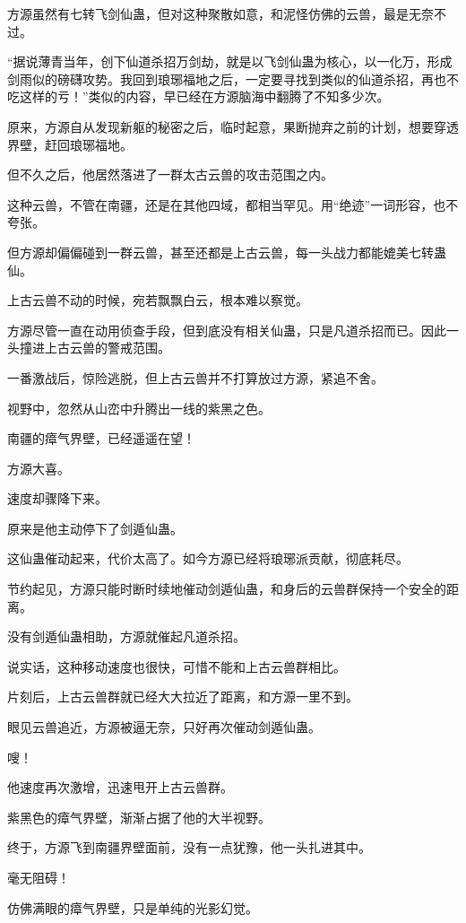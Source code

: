 \begin{this_body}
方源虽然有七转飞剑仙蛊，但对这种聚散如意，和泥怪仿佛的云兽，最是无奈不过。

“据说薄青当年，创下仙道杀招万剑劫，就是以飞剑仙蛊为核心，以一化万，形成剑雨似的磅礴攻势。我回到琅琊福地之后，一定要寻找到类似的仙道杀招，再也不吃这样的亏！”类似的内容，早已经在方源脑海中翻腾了不知多少次。

原来，方源自从发现新躯的秘密之后，临时起意，果断抛弃之前的计划，想要穿透界壁，赶回琅琊福地。

但不久之后，他居然落进了一群太古云兽的攻击范围之内。

这种云兽，不管在南疆，还是在其他四域，都相当罕见。用“绝迹”一词形容，也不夸张。

但方源却偏偏碰到一群云兽，甚至还都是上古云兽，每一头战力都能媲美七转蛊仙。

上古云兽不动的时候，宛若飘飘白云，根本难以察觉。

方源尽管一直在动用侦查手段，但到底没有相关仙蛊，只是凡道杀招而已。因此一头撞进上古云兽的警戒范围。

一番激战后，惊险逃脱，但上古云兽并不打算放过方源，紧追不舍。

视野中，忽然从山峦中升腾出一线的紫黑之色。

南疆的瘴气界壁，已经遥遥在望！

方源大喜。

速度却骤降下来。

原来是他主动停下了剑遁仙蛊。

这仙蛊催动起来，代价太高了。如今方源已经将琅琊派贡献，彻底耗尽。

节约起见，方源只能时断时续地催动剑遁仙蛊，和身后的云兽群保持一个安全的距离。

没有剑遁仙蛊相助，方源就催起凡道杀招。

说实话，这种移动速度也很快，可惜不能和上古云兽群相比。

片刻后，上古云兽群就已经大大拉近了距离，和方源一里不到。

眼见云兽追近，方源被逼无奈，只好再次催动剑遁仙蛊。

嗖！

他速度再次激增，迅速甩开上古云兽群。

紫黑色的瘴气界壁，渐渐占据了他的大半视野。

终于，方源飞到南疆界壁面前，没有一点犹豫，他一头扎进其中。

毫无阻碍！

仿佛满眼的瘴气界壁，只是单纯的光影幻觉。


\end{this_body}
